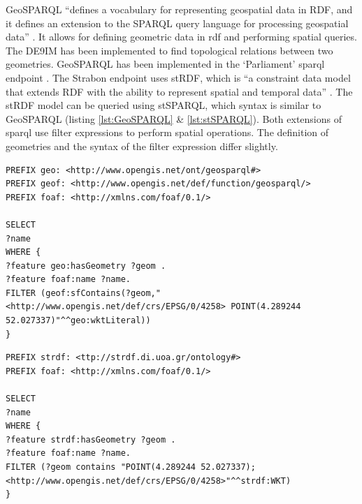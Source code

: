 GeoSPARQL \enquote{defines a vocabulary for representing geospatial data in RDF, and it defines an extension to the SPARQL query language for processing geospatial data} \cite[p. xvi]{LD:OGC}. It allows for defining geometric data in \ac{rdf} and performing spatial queries. The \ac{DE9IM} \citep{GIS:9IM} has been implemented to find topological relations between two geometries. GeoSPARQL has been implemented in the `Parliament' \ac{sparql} endpoint \citep{LD:GeoSPARQL}. The Strabon endpoint uses stRDF, which is \enquote{a constraint data model that extends RDF with the ability to represent spatial and temporal data} \cite[p. 425]{SSW:Koubarakis}. The stRDF model can be queried using stSPARQL, which syntax is similar to GeoSPARQL (listing \ref{lst:GeoSPARQL} \& \ref{lst:stSPARQL}). Both extensions of \ac{sparql} use filter expressions to perform spatial operations. The definition of geometries and the syntax of the filter expression differ slightly.

\begin{lstlisting}[caption={A GeoSPARQL query to find the names of features that contain a point geometry}, label={lst:GeoSPARQL}]
PREFIX geo: <http://www.opengis.net/ont/geosparql#>
PREFIX geof: <http://www.opengis.net/def/function/geosparql/>
PREFIX foaf: <http://xmlns.com/foaf/0.1/> 

SELECT 
?name
WHERE {
?feature geo:hasGeometry ?geom .
?feature foaf:name ?name.
FILTER (geof:sfContains(?geom,"<http://www.opengis.net/def/crs/EPSG/0/4258> POINT(4.289244 52.027337)"^^geo:wktLiteral))
}
\end{lstlisting}

\begin{lstlisting}[caption={A stSPARQL query to find the names of features that contain a point geometry}, label={lst:stSPARQL}]
PREFIX strdf: <ttp://strdf.di.uoa.gr/ontology#>
PREFIX foaf: <http://xmlns.com/foaf/0.1/> 

SELECT 
?name
WHERE {
?feature strdf:hasGeometry ?geom .
?feature foaf:name ?name.
FILTER (?geom contains "POINT(4.289244 52.027337);<http://www.opengis.net/def/crs/EPSG/0/4258>"^^strdf:WKT)
}
\end{lstlisting}

